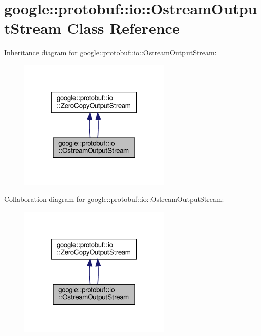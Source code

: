 \hypertarget{classgoogle_1_1protobuf_1_1io_1_1OstreamOutputStream}{}\section{google\+:\+:protobuf\+:\+:io\+:\+:Ostream\+Output\+Stream Class Reference}
\label{classgoogle_1_1protobuf_1_1io_1_1OstreamOutputStream}


Inheritance diagram for google\+:\+:protobuf\+:\+:io\+:\+:Ostream\+Output\+Stream\+:
\nopagebreak
\begin{figure}[H]
\begin{center}
\leavevmode
\includegraphics[width=206pt]{classgoogle_1_1protobuf_1_1io_1_1OstreamOutputStream__inherit__graph}
\end{center}
\end{figure}


Collaboration diagram for google\+:\+:protobuf\+:\+:io\+:\+:Ostream\+Output\+Stream\+:
\nopagebreak
\begin{figure}[H]
\begin{center}
\leavevmode
\includegraphics[width=206pt]{classgoogle_1_1protobuf_1_1io_1_1OstreamOutputStream__coll__graph}
\end{center}
\end{figure}

